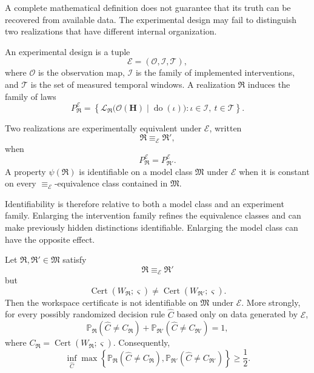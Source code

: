 
A complete mathematical definition does not guarantee that its truth can be
recovered from available data. The experimental design may fail to distinguish
two realizations that have different internal organization.

\begin{definition}
\label{def:workspace-experiment-design}
An experimental design is a tuple
\[
\mathcal E
=
(\mathcal O,\mathcal I,\mathcal T),
\]
where \(\mathcal O\) is the observation map, \(\mathcal I\) is the family of
implemented interventions, and \(\mathcal T\) is the set of measured temporal
windows. A realization \(\mathfrak R\) induces the family of laws
\[
P_{\mathfrak R}^{\mathcal E}
=
\left
\{
\mathcal L_{\mathfrak R}
\bigl(\mathcal O(\mathbf H)\mid\operatorname{do}(\iota)\bigr):
\iota\in\mathcal I,
\ t\in\mathcal T
\right\}.
\]
\end{definition}

\begin{definition}
Two realizations are experimentally equivalent under \(\mathcal E\), written
\[
\mathfrak R\equiv_{\mathcal E}\mathfrak R',
\]
when
\[
P_{\mathfrak R}^{\mathcal E}
=
P_{\mathfrak R'}^{\mathcal E}.
\]
A property \(\psi(\mathfrak R)\) is identifiable on a model class
\(\mathfrak M\) under \(\mathcal E\) when it is constant on every
\(\equiv_{\mathcal E}\)-equivalence class contained in \(\mathfrak M\).
\end{definition}

Identifiability is therefore relative to both a model class and an experiment
family. Enlarging the intervention family refines the equivalence classes and
can make previously hidden distinctions identifiable. Enlarging the model
class can have the opposite effect.


\begin{theorem}
\label{thm:workspace-nonidentifiability}
Let \(\mathfrak R,\mathfrak R'\in\mathfrak M\) satisfy
\[
\mathfrak R\equiv_{\mathcal E}\mathfrak R'
\]
but
\[
\operatorname{Cert}(W_{\mathfrak R};\varsigma)
\neq
\operatorname{Cert}(W_{\mathfrak R'};\varsigma).
\]
Then the workspace certificate is not identifiable on \(\mathfrak M\) under
\(\mathcal E\). More strongly, for every possibly randomized decision rule
\(\widehat C\) based only on data generated by \(\mathcal E\),
\[
\boxed{
\mathbb P_{\mathfrak R}
\left(
\widehat C\neq C_{\mathfrak R}
\right)
+
\mathbb P_{\mathfrak R'}
\left(
\widehat C\neq C_{\mathfrak R'}
\right)
=1,
}
\]
where \(C_{\mathfrak R}=\operatorname{Cert}(W_{\mathfrak R};\varsigma)\).
Consequently,
\[
\inf_{\widehat C}
\max\left\{
\mathbb P_{\mathfrak R}(\widehat C\neq C_{\mathfrak R}),
\mathbb P_{\mathfrak R'}(\widehat C\neq C_{\mathfrak R'})
\right\}
\geq\frac12.
\]
\end{theorem}

